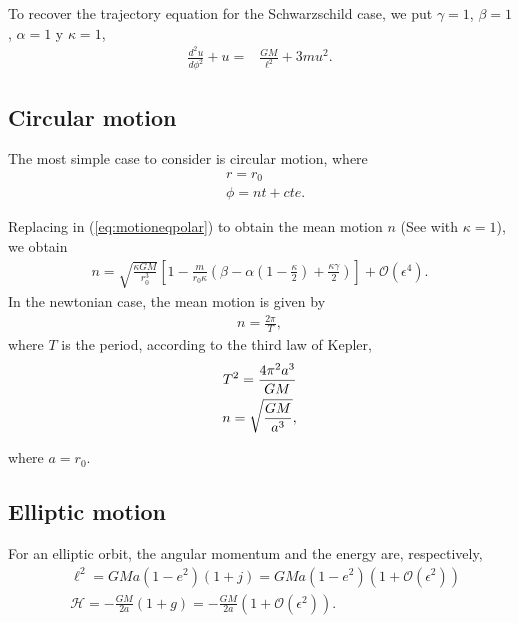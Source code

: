 To recover the trajectory equation for the Schwarzschild case, we put $\gamma = 1$, $\beta = 1$, $\alpha = 1$ y $\kappa = 1$,
\begin{align*}
	\frac{d^2u}{d\phi^2}+u = &\frac{GM}{\ell^2}+3 mu^2.
\end{align*}

\subsection{Circular motion}
The most simple case to consider is circular motion, where
\begin{subequations}
\label{eq:circularmotioncoordinates}
\begin{align}
	&r = r_0\\
	&\phi = nt + cte.
\end{align}
\end{subequations}

Replacing in (\ref{eq:motioneqpolar}) to obtain the mean motion $n$ (See \cite{Brumberg} with $\kappa = 1$), we obtain
\begin{align}\label{eq: meanmotion}
n = \sqrt{\frac{\kappa GM}{r_0^3}} \left[1-\frac{m}{r_0\kappa} \left(\beta - \alpha\left(1-\frac{\kappa}{2}\right)+\frac{\kappa \gamma}{2}\right)\right]+\mathcal{O}(\epsilon^4).
\end{align}
In the newtonian case, the mean motion is given by
\begin{align}
	n = \frac{2\pi}{T},
\end{align}
where $T$ is the period, according to the third law of Kepler,
\begin{align}
\notag
	T ^2  = \frac{4\pi^2a^3}{GM}\\
	n = \sqrt{\frac{GM}{a^3}},
\end{align}

where $a = r_0$.

\subsection{Elliptic motion}

For an elliptic orbit, the angular momentum and the energy are, respectively,
\begin{align}
\label{eq: angularmomentumeliptic}
	&\ell^2 = GMa(1-e^2)(1+j)= GMa(1-e^2)(1+\mathcal{O}(\epsilon^2))\\
\label{eq: energyeliptic}
	&\mathcal{H} = - \frac{GM}{2a}(1+g) = - \frac{GM}{2a}(1+\mathcal{O}(\epsilon^2)).
\end{align}

